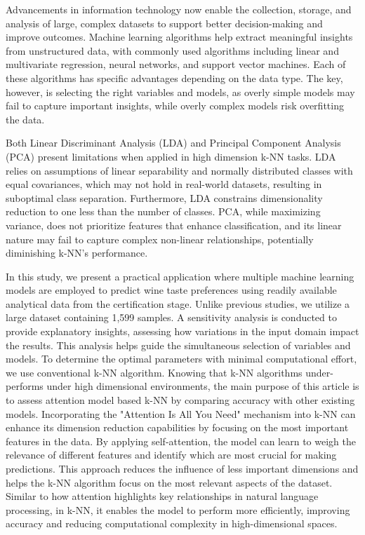 \documentclass[conference]{IEEEtran}
\begin{document}
Advancements in information technology now enable the collection, storage, and analysis of large, complex datasets to support better decision-making and improve outcomes. Machine learning algorithms help extract meaningful insights from unstructured data, with commonly used algorithms including linear and multivariate regression, neural networks, and support vector machines. Each of these algorithms has specific advantages depending on the data type. The key, however, is selecting the right variables and models, as overly simple models may fail to capture important insights, while overly complex models risk overfitting the data.

Both Linear Discriminant Analysis (LDA) and Principal Component Analysis (PCA) present limitations when applied in high dimension k-NN tasks. LDA relies on assumptions of linear separability and normally distributed classes with equal covariances, which may not hold in real-world datasets, resulting in suboptimal class separation. Furthermore, LDA constrains dimensionality reduction to one less than the number of classes. PCA, while maximizing variance, does not prioritize features that enhance classification, and its linear nature may fail to capture complex non-linear relationships, potentially diminishing k-NN's performance.

In this study, we present a practical application where multiple machine learning models are employed to predict wine taste preferences using readily available analytical data from the certification stage. Unlike previous studies, we utilize a large dataset containing 1,599 samples. A sensitivity analysis is conducted to provide explanatory insights, assessing how variations in the input domain impact the results. This analysis helps guide the simultaneous selection of variables and models. To determine the optimal parameters with minimal computational effort, we use conventional k-NN algorithm. Knowing that k-NN algorithms under-performs under high dimensional environments, the main purpose of this article is to assess attention model based k-NN by comparing accuracy with other existing models. Incorporating the "Attention Is All You Need" mechanism into k-NN can enhance its dimension reduction capabilities by focusing on the most important features in the data. By applying self-attention, the model can learn to weigh the relevance of different features and identify which are most crucial for making predictions. This approach reduces the influence of less important dimensions and helps the k-NN algorithm focus on the most relevant aspects of the dataset. Similar to how attention highlights key relationships in natural language processing, in k-NN, it enables the model to perform more efficiently, improving accuracy and reducing computational complexity in high-dimensional spaces.
\end{document}
